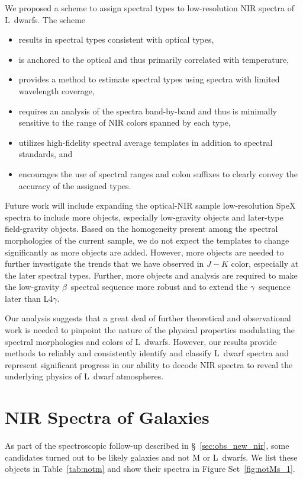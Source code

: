 \documentclass[modern,trackchanges]{aastex61}
\begin{document}
We proposed a scheme to assign spectral types to low-resolution NIR spectra of L~dwarfs.
The scheme
\begin{itemize}
  \item results in spectral types consistent with optical types,
  \item is anchored to the optical and thus primarily correlated with temperature,
  \item provides a method to estimate spectral types using spectra with limited wavelength coverage,
  \item requires an analysis of the spectra band-by-band and thus is minimally sensitive to the range of NIR colors spanned by each type,
  \item utilizes high-fidelity spectral average templates in addition to spectral standards, and
  \item encourages the use of spectral ranges and colon suffixes to clearly convey the accuracy of the assigned types.
\end{itemize}

Future work will include expanding the optical-NIR sample low-resolution SpeX spectra to include more objects, especially low-gravity objects and later-type field-gravity objects.
Based on the homogeneity present among the spectral morphologies of the current sample, we do not expect the templates to change significantly as more objects are added.
However, more objects are needed to further investigate the trends that we have observed in $J-K$ color, especially at the later spectral types.
Further, more objects and analysis are required to make the low-gravity $\beta$~spectral sequence more robust and to extend the $\gamma$~sequence later than L4$\gamma$.

Our analysis suggests that a great deal of further theoretical and observational work is needed to pinpoint the nature of the physical properties modulating the spectral morphologies and colors of L~dwarfs.
However, our results provide methods to reliably and consistently identify and classify L~dwarf spectra and represent significant progress in our ability to decode NIR spectra to reveal the underlying physics of L~dwarf atmospheres.

\clearpage
\appendix
\section{NIR Spectra of Galaxies}
\label{sec:galaxies}
As part of the spectroscopic follow-up described in \S~\ref{sec:obs_new_nir}, some candidates turned out to be likely galaxies and not M or L~dwarfs. We list these objects in Table~\ref{tab:notm} and show their spectra in Figure Set~\ref{fig:notMs_1}.
\end{document}
